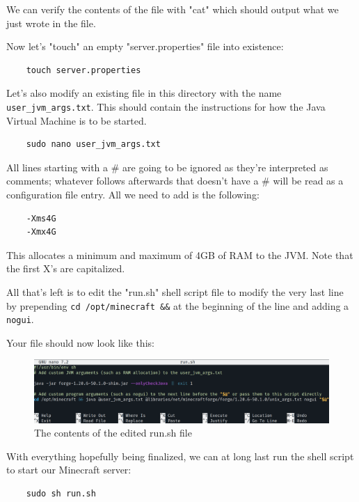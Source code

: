 \documentclass[]{article}
\begin{document}
We can verify the contents of the file with "cat" which should output what we just wrote in the file.

Now let's "touch" an empty "server.properties" file into existence:

\begin{verbatim}
	touch server.properties
\end{verbatim}

Let's also modify an existing file in this directory with the name \texttt{user\_jvm\_args.txt}. This should contain the instructions for how the Java Virtual Machine is to be started.

\begin{verbatim}
	sudo nano user_jvm_args.txt
\end{verbatim}

All lines starting with a \# are going to be ignored as they're interpreted as comments; whatever follows afterwards that doesn't have a \# will be read as a configuration file entry. All we need to add is the following:

\begin{verbatim}
	-Xms4G
	-Xmx4G
\end{verbatim}

This allocates a minimum and maximum of 4GB of RAM to the JVM. Note that the first X's are capitalized.

All that's left is to edit the "run.sh" shell script file to modify the very last line by prepending \texttt{cd /opt/minecraft \&\&} at the beginning of the line and adding a \texttt{nogui}.

Your file should now look like this:

\begin{figure}[h!]
	\caption{The contents of the edited run.sh file}
	\centering
	\includegraphics[width=1\textwidth]{run-sh}
\end{figure}
\FloatBarrier

With everything hopefully being finalized, we can at long last run the shell script to start our Minecraft server:

\begin{verbatim}
	sudo sh run.sh
\end{verbatim}
\end{document}
